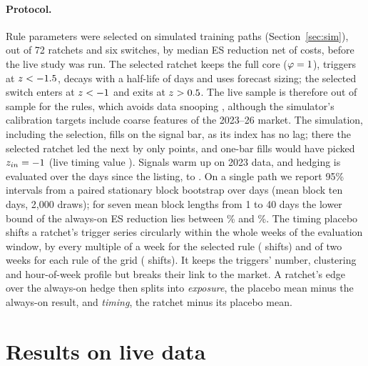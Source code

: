 \documentclass[10pt,a4paper]{article}
\newcommand{\BVIV}{\textsc{bviv}}
\begin{document}
\paragraph{Protocol.} Rule parameters were selected on \NTrain{} simulated training paths (Section~\ref{sec:sim}), out of 72 ratchets and six switches, by median ES reduction net of costs, before the live study was run. The selected ratchet keeps the full core ($\varphi=1$), triggers at $z<-1.5$, decays with a half-life of \RatchetHl{} days and uses forecast sizing; the selected switch enters at $z<-1$ and exits at $z>0.5$. The live sample is therefore out of sample for the rules, which avoids data snooping \citep{white2000reality,hansen2005spa,bailey2014pseudo}, although the simulator's calibration targets include coarse features of the 2023--26 market. The simulation, including the selection, fills on the signal bar, as its index has no lag; there the selected ratchet led the next by only \TrainMargin{} points, and one-bar fills would have picked $z_{in}=-1$ (live timing value \DelayRatchetTiming). Signals warm up on 2023 data, and hedging is evaluated over the \LiveEvalDays{} days since the listing, \LiveEvalStart{} to \LiveEvalEnd. On a single path we report 95\% intervals from a paired stationary block bootstrap \citep{politis1994stationary} over days (mean block ten days, 2{,}000 draws); for seven mean block lengths from 1 to 40 days the lower bound of the always-on ES reduction lies between \LiveBlockLoMin\% and \LiveBlockLoMax\%. The timing placebo shifts a ratchet's trigger series circularly within the whole weeks of the evaluation window, by every multiple of a week for the selected rule (\LivePlaceboN{} shifts) and of two weeks for each rule of the grid (\LiveGridShifts{} shifts). It keeps the triggers' number, clustering and hour-of-week profile but breaks their link to the market. A ratchet's edge over the always-on hedge then splits into \emph{exposure}, the placebo mean minus the always-on result, and \emph{timing}, the ratchet minus its placebo mean.

\section{Results on live data}\label{sec:live}

\begin{table}[t]
\centering\small\setlength{\tabcolsep}{4.5pt}

\caption{Hedging a 1-BTC spot book with the Bitfinex \BVIV{} perpetual, \LiveEvalStart{} to \LiveEvalEnd{}, executed one bar after the signal at the mark (\%, except turnover). ES/Var red.: reduction in daily ES$_{97.5}$ and variance against unhedged. Max DD: maximum drawdown of compounded daily returns. Tail offset: hedge P\&L net of costs as a share of BTC losses on the worst 5\% of days. Hedge P\&L (index P\&L minus funding), Funding and Trading (fees and slippage): \% of BTC notional a year. Turnover: perpetual notional traded per year over BTC notional. Notional: average hedge notional in \% of BTC.}
\label{tab:livehedge}
\end{table}
\end{document}

